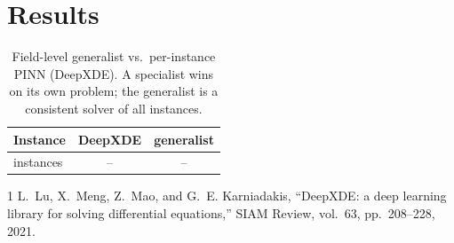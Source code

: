 \documentclass[conference,10pt]{IEEEtran}
\begin{document}
\section{Results}
\begin{table}[!t]
\caption{Field-level generalist vs.\ per-instance PINN (DeepXDE). A
specialist wins on its own problem; the generalist is a consistent
solver of all instances.}
\label{tab:field}
\centering
\begin{tabular}{lcc}
\toprule
Instance & DeepXDE & generalist \\
\midrule
instances & -- & -- \\
\bottomrule
\end{tabular}
\end{table}

\begin{thebibliography}{1}
 L.~Lu, X.~Meng, Z.~Mao, and G.~E. Karniadakis, ``DeepXDE: a deep learning library for solving differential equations,'' SIAM Review, vol.~63, pp.~208--228, 2021.
\end{thebibliography}
\end{document}
